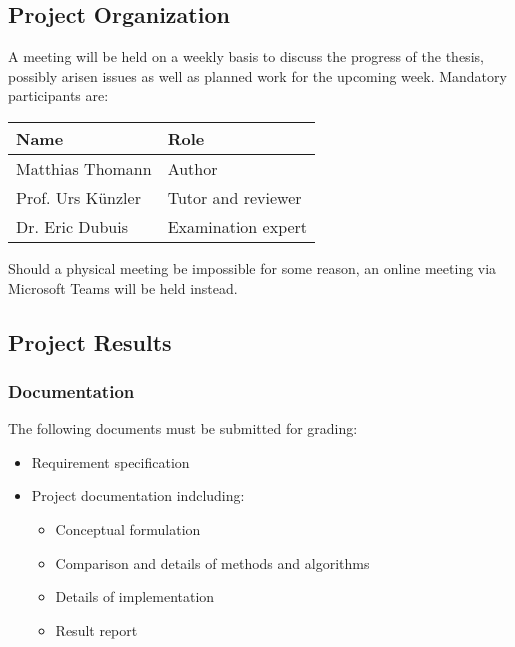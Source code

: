 
\clearpage
\subsection{Project Organization}
A meeting will be held on a weekly basis to discuss the progress of the thesis, possibly arisen issues as well as planned work for the upcoming week.
\vspace{\baselineskip}
\newline
\noindent Mandatory participants are:
\vspace{\baselineskip}
\newline
\noindent\begin{tabular}{|l|l|}
    \hline
    \textbf{Name}       & \textbf{Role}         \\ \hline
    Matthias Thomann    & Author                \\ \hline
    Prof. Urs Künzler   & Tutor and reviewer    \\ \hline
    Dr. Eric Dubuis     & Examination expert    \\ \hline
\end{tabular}

\vspace{\baselineskip}
\noindent Should a physical meeting be impossible for some reason, an online meeting via Microsoft Teams will be held instead.


\subsection{Project Results}

\subsubsection{Documentation}
The following documents must be submitted for grading:
\begin{itemize}
    \item Requirement specification
    \item Project documentation indcluding:
    \begin{itemize}
        \item Conceptual formulation
        \item Comparison and details of methods and algorithms
        \item Details of implementation
        \item Result report
    \end{itemize}
\end{itemize}


